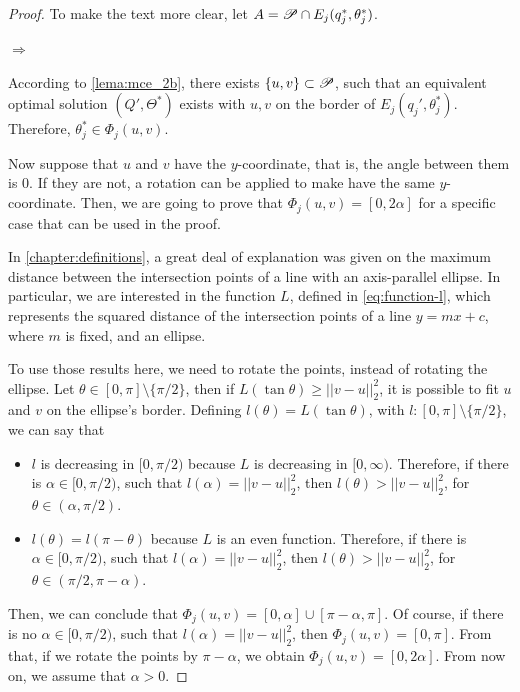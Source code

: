 \begin{proof}
	To make the text more clear, let $A=\mathscr{P}\cap E_j(q^*_j, \theta^*_j)$.
	
	$\Rightarrow$
	
	According to \autoref{lema:mce_2b}, there exists $\{u, v\} \subset \mathscr{P}$, such that an equivalent optimal solution $(Q', \Theta^*)$ exists with $u, v$ on the border of $E_j(q_j', \theta_j^*)$. Therefore, $\theta_j^*\in\Phi_j(u,v)$.
	
	Now suppose that $u$ and $v$ have the $y$-coordinate, that is, the angle between them is $0$. If they are not, a rotation can be applied to make have the same $y$-coordinate. Then, we are going to prove that $\Phi_j(u, v) = [0, 2\alpha]$ for a specific case that can be used in the proof.
	
	In \autoref{chapter:definitions}, a great deal of explanation was given on the maximum distance between the intersection points of a line with an axis-parallel ellipse. In particular, we are interested in the function $L$, defined in \autoref{eq:function-l}, which represents the squared distance of the intersection points of a line  $y=mx + c$, where $m$ is fixed, and an ellipse.
	
	To use those results here, we need to rotate the points, instead of rotating the ellipse. Let $\theta \in [0, \pi]\setminus\{\pi/2\}$, then if $L(\tan{\theta}) \ge ||v-u||_2^2$, it is possible to fit $u$ and $v$ on the ellipse's border. Defining $l(\theta)=L(\tan{\theta})$, with $l:[0, \pi]\setminus\{\pi/2\}$, we can say that
	
	\begin{itemize}
		\item $l$ is decreasing in $[0, \pi/2)$ because $L$ is decreasing in $[0, \infty)$. Therefore, if there is $\alpha\in[0, \pi/2)$, such that $l(\alpha) = ||v-u||_2^2$, then $l(\theta)>||v-u||_2^2$, for $\theta\in(\alpha, \pi/2)$.
		\item $l(\theta) = l(\pi-\theta)$ because $L$ is an even function. Therefore, if there is $\alpha\in[0, \pi/2)$, such that $l(\alpha) = ||v-u||_2^2$, then $l(\theta)>||v-u||_2^2$, for $\theta\in(\pi/2,\pi-\alpha)$.
	\end{itemize}
	Then, we can conclude that $\Phi_j(u, v) = [0, \alpha]\cup [\pi-\alpha, \pi]$. Of course, if there is no $\alpha\in[0, \pi/2)$, such that $l(\alpha)=||v-u||_2^2$, then $\Phi_j(u,v)=[0, \pi]$.
	From that, if we rotate the points by $\pi-\alpha$, we obtain $\Phi_j(u,v)=[0, 2\alpha]$. From now on, we assume that $\alpha>0$.
	

\end{proof}
